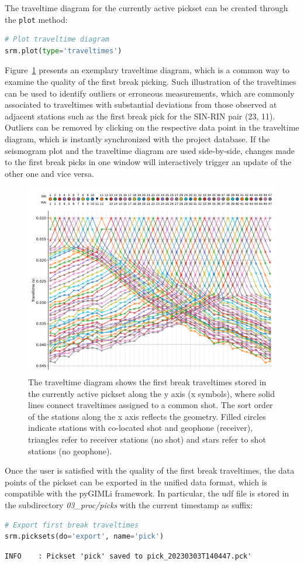 \documentclass[a4paper,fleqn]{cas-sc}
\begin{document}
The traveltime diagram for the currently active pickset can be created through the \texttt{plot} method:
\begin{lstlisting}[language=Python, firstnumber=20]
# Plot traveltime diagram
srm.plot(type='traveltimes')
\end{lstlisting}
Figure~\ref{fig:traveltimes_intro} presents an exemplary traveltime diagram, which is a common way to examine the quality of the first break picking. Such illustration of the traveltimes can be used to identify outliers or erroneous measurements, which are commonly associated to traveltimes with substantial deviations from those observed at adjacent stations such as the first break pick for the SIN-RIN pair (23, 11). Outliers can be removed by clicking on the respective data point in the traveltime diagram, which is instantly synchronized with the project database. If the seismogram plot and the traveltime diagram are used side-by-side, changes made to the first break picks in one window will interactively trigger an update of the other one and vice versa.
\begin{figure}
	\centering
	\includegraphics[width=.75\textwidth]{figures/traveltimes_syn.pdf}
	\caption{The traveltime diagram shows the first break traveltimes stored in the currently active pickset along the y axis (x symbols), where solid lines connect traveltimes assigned to a common shot. The sort order of the stations along the x axis reflects the geometry. Filled circles indicate stations with co-located shot and geophone (receiver), triangles refer to receiver stations (no shot) and stars refer to shot stations (no geophone).}
	\label{fig:traveltimes_intro}
\end{figure}
Once the user is satisfied with the quality of the first break traveltimes, the data points of the pickset can be exported in the unified data format, which is compatible with the pyGIMLi framework. In particular, the udf file is stored in the subdirectory \textit{03\_proc/picks} with the current timestamp as suffix:
\begin{lstlisting}[language=Python, firstnumber=22]
# Export first break traveltimes
srm.picksets(do='export', name='pick')
\end{lstlisting}
\begin{footnotesize}
\begin{verbatim}
INFO    : Pickset 'pick' saved to pick_20230303T140447.pck'
\end{verbatim}
\end{footnotesize}
\end{document}
